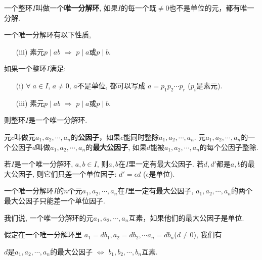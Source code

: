 \begin{Definition}[唯一分解环]
一个整环$I$叫做一个\textbf{唯一分解环}, 如果$I$的每一个既$\neq \mathfrak{0}$也不是单位的元，都有唯一分解.
\end{Definition}

\begin{Theorem}
一个唯一分解环有以下性质, 
\begin{itemize}
	\item[(iii)] 素元$p \mid ab$ $\Rightarrow$ $p \mid a$或$p \mid b$.
\end{itemize}
\end{Theorem}

\begin{Theorem}
如果一个整环$I$满足:
\begin{itemize}
	\item[(i)] $\forall \; a \in I$, $a \neq 0$, $a$不是单位, 都可以写成
	$a = p_1 p_2 \cdots p_r$ ($p_i$是素元). 
	\item[(iii)] 素元$p \mid ab$ $\Rightarrow$ $p \mid a$或$p \mid b$. 
\end{itemize}
则整环$I$是一个唯一分解环.
\end{Theorem}

\begin{Definition}[公因子]
元$c$叫做元$a_1, a_2, \cdots, a_n$的\textbf{公因子}，如果$c$能同时整除$a_1, a_2, \cdots, a_n$. 元$a_1, a_2, \cdots, a_n$的一个公因子$d$叫做$a_1, a_2, \cdots, a_n$的\textbf{最大公因子}, 如果$d$能被$a_1, a_2, \cdots, a_n$的每个公因子整除.
\end{Definition}

\begin{Theorem}
若$I$是一个唯一分解环, $a, b \in I$, 则$a, b$在$I$里一定有最大公因子. 若$d, d'$都是$a, b$的最大公因子, 则它们只差一个单位因子: $d' = \epsilon d$ ($\epsilon$是单位).
\end{Theorem}

\begin{Corollary}
一个唯一分解环$I$的$n$个元$a_1, a_2, \cdots, a_n$在$I$里一定有最大公因子, $a_1, a_2, \cdots, a_n$的两个最大公因子只能差一个单位因子.
\end{Corollary}

\begin{Definition}[互素]
我们说, 一个唯一分解环的元$a_1, a_2, \cdots, a_n$互素，如果他们的最大公因子是单位.
\end{Definition}

\begin{Proposition}
假定在一个唯一分解环里
$a_1 = d b_1, a_2 = d b_2, \cdots a_n = d b_n$($d \ne 0$), 我们有
\begin{tightcenter}
$d$是$a_1, a_2, \cdots, a_n$的最大公因子 $\Leftrightarrow$ $b_1, b_2, \cdots, b_n$互素.
\end{tightcenter}
\end{Proposition}


